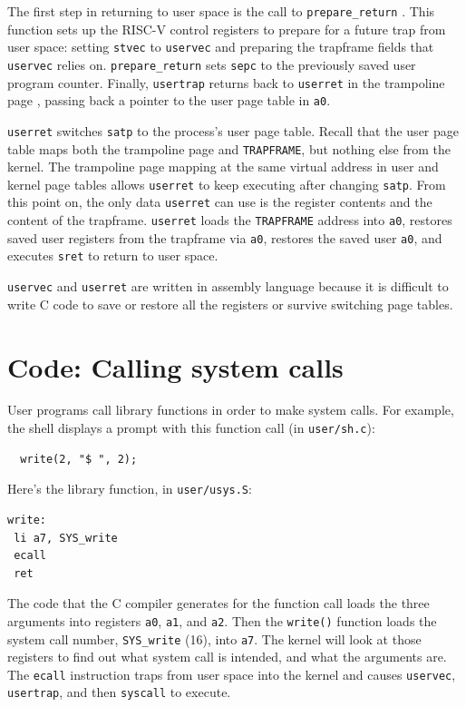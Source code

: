 The first step in returning to user space is the call to {\tt prepare\_return}
{}.
This function sets up the RISC-V control registers to prepare for a
future trap from user space: setting {\tt stvec}
to {\tt uservec} and preparing the trapframe fields that
{\tt uservec} relies on.
{\tt prepare\_return} sets {\tt sepc} to the previously
saved user program counter.
Finally, {\tt usertrap}
returns back to {\tt userret} in the trampoline page
,
passing back a pointer to the user page table in {\tt a0}.

{\tt userret} switches {\tt satp} to the process's user page table.
Recall that the user page table maps both the trampoline page
and {\tt TRAPFRAME}, but nothing else from the kernel.
The trampoline page mapping at the same
virtual address in user and kernel page tables allows
{\tt userret} to keep executing after changing {\tt satp}.
From this point on, the only data {\tt userret} can use is
the register contents and the content of the trapframe.
{\tt userret} loads the {\tt TRAPFRAME} address into {\tt a0},
restores saved user registers from the trapframe via {\tt a0},
restores the saved user {\tt a0},
and executes {\tt sret} to return to user space.

{\tt uservec} and {\tt userret} are written in assembly
language because it is difficult to write C code to
save or  restore all the registers or survive switching
page tables.

\section{Code: Calling system calls}

User programs call library functions in order to make system calls.
For example, the shell displays a prompt with this function call
(in {\tt user/sh.c}):

\begin{verbatim}
  write(2, "$ ", 2);
\end{verbatim}

Here's the library function, in {\tt user/usys.S}:

\begin{verbatim}
write:
 li a7, SYS_write
 ecall
 ret
\end{verbatim}

The code that the C compiler generates for the function call
loads the three arguments into registers {\tt a0},
{\tt a1}, and {\tt a2}. Then the {\tt write()} function
loads the system call number, {\tt SYS\_write} (16), into {\tt a7}.
The kernel will look at those registers to find out what
system call is intended, and what the arguments are.
The \lstinline{ecall} instruction traps from user space
into the kernel and causes
{\tt uservec},
{\tt usertrap}, and then {\tt syscall} to execute.

